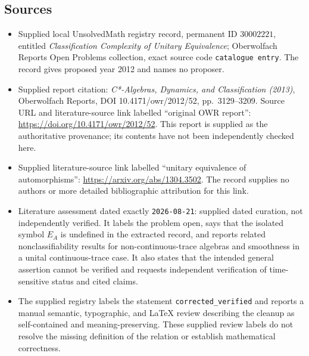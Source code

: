 \documentclass[11pt]{article}
\begin{document}
\subsection{Sources}
\begin{itemize}
\item Supplied local UnsolvedMath registry record, permanent ID \(30002221\), entitled \emph{Classification Complexity of Unitary Equivalence}; Oberwolfach Reports Open Problems collection, exact source code \texttt{catalogue entry}. The record gives proposed year 2012 and names no proposer.
\item Supplied report citation: \emph{C*-Algebras, Dynamics, and Classification (2013)}, Oberwolfach Reports, DOI 10.4171/owr/2012/52, pp.\ 3129--3209. Source URL and literature-source link labelled ``original OWR report'': \url{https://doi.org/10.4171/owr/2012/52}. This report is supplied as the authoritative provenance; its contents have not been independently checked here.
\item Supplied literature-source link labelled ``unitary equivalence of automorphisms'': \url{https://arxiv.org/abs/1304.3502}. The record supplies no authors or more detailed bibliographic attribution for this link.
\item Literature assessment dated exactly \texttt{2026-08-21}: supplied dated curation, not independently verified. It labels the problem open, says that the isolated symbol \(E_A\) is undefined in the extracted record, and reports related nonclassifiability results for non-continuous-trace algebras and smoothness in a unital continuous-trace case. It also states that the intended general assertion cannot be verified and requests independent verification of time-sensitive status and cited claims.
\item The supplied registry labels the statement \texttt{corrected\_verified} and reports a manual semantic, typographic, and LaTeX review describing the cleanup as self-contained and meaning-preserving. These supplied review labels do not resolve the missing definition of the relation or establish mathematical correctness.
\end{itemize}
\end{document}
